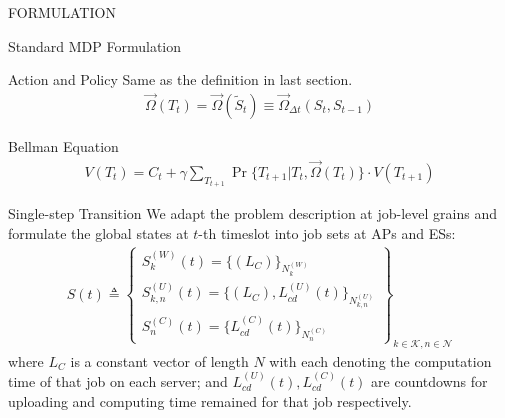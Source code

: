 \documentclass[10pt, conference, letterpaper]{IEEEtran}
\begin{document}
\begin{section}{FORMULATION}
\begin{subsection}{Standard MDP Formulation}
            \begin{subsubsection}{Action and Policy}
                Same as the definition in last section.
                \begin{align}
                    \vec{\Omega}(T_t) = \vec{\Omega}(\tilde{S}_t) \equiv \vec{\Omega}_{\Delta{t}}(S_t, S_{t-1})
                \end{align}
            \end{subsubsection}

            \begin{subsubsection}{Bellman Equation}
                \begin{align}
                    V(T_{t}) = C_t + \gamma \sum_{T_{t+1}} \Pr\{T_{t+1}|T_{t}, \vec{\Omega}(T_t)\} \cdot V(T_{t+1})
                \end{align}
            \end{subsubsection}
        \end{subsection}

        \begin{subsection}{Single-step Transition}
            We adapt the problem description at job-level grains and formulate the global states at $t$-th timeslot into job sets at APs and ESs:
            \begin{align}
                S(t) \triangleq
                \begin{Bmatrix}
                    S_{k}^{(W)}(t) = \{ (L_C) \}_{N_{k}^{(W)}}
                    \\
                    S_{k,n}^{(U)}(t)= \{ (L_C), L_{cd}^{(U)}(t) \}_{N_{k,n}^{(U)}}
                    \\
                    S_{n}^{(C)}(t)  = \{ L_{cd}^{(C)}(t) \}_{N_{n}^{(C)}}
                \end{Bmatrix}_{k\in\mathcal{K}, n\in\mathcal{N}}
            \end{align}
            where $L_C$ is a constant vector of length $N$ with each denoting the computation time of that job on each server; and $L^{(U)}_{cd}(t), L^{(C)}_{cd}(t)$ are countdowns for uploading and computing time remained for that job respectively.
            

\end{subsection}
\end{section}
\end{document}
